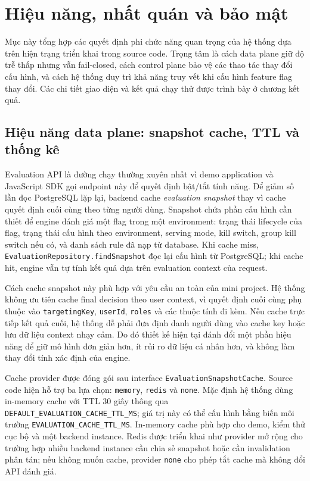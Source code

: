 \section{Hiệu năng, nhất quán và bảo mật}

Mục này tổng hợp các quyết định phi chức năng quan trọng của hệ thống dựa trên hiện trạng triển khai trong source code. Trọng tâm là cách data plane giữ độ trễ thấp nhưng vẫn fail-closed, cách control plane bảo vệ các thao tác thay đổi cấu hình, và cách hệ thống duy trì khả năng truy vết khi cấu hình feature flag thay đổi. Các chi tiết giao diện và kết quả chạy thử được trình bày ở chương kết quả.

\subsection{Hiệu năng data plane: snapshot cache, TTL và thống kê}

Evaluation API là đường chạy thường xuyên nhất vì demo application và JavaScript SDK gọi endpoint này để quyết định bật/tắt tính năng. Để giảm số lần đọc PostgreSQL lặp lại, backend cache \textit{evaluation snapshot} thay vì cache quyết định cuối cùng theo từng người dùng. Snapshot chứa phần cấu hình cần thiết để engine đánh giá một flag trong một environment: trạng thái lifecycle của flag, trạng thái cấu hình theo environment, serving mode, kill switch, group kill switch nếu có, và danh sách rule đã nạp từ database. Khi cache miss, \texttt{EvaluationRepository.findSnapshot} đọc lại cấu hình từ PostgreSQL; khi cache hit, engine vẫn tự tính kết quả dựa trên evaluation context của request.

Cách cache snapshot này phù hợp với yêu cầu an toàn của mini project. Hệ thống không ưu tiên cache final decision theo user context, vì quyết định cuối cùng phụ thuộc vào \texttt{targetingKey}, \texttt{userId}, \texttt{roles} và các thuộc tính đi kèm. Nếu cache trực tiếp kết quả cuối, hệ thống dễ phải đưa định danh người dùng vào cache key hoặc lưu dữ liệu context nhạy cảm. Do đó thiết kế hiện tại đánh đổi một phần hiệu năng để giữ mô hình đơn giản hơn, ít rủi ro dữ liệu cá nhân hơn, và không làm thay đổi tính xác định của engine.

Cache provider được đóng gói sau interface \texttt{EvaluationSnapshotCache}. Source code hiện hỗ trợ ba lựa chọn: \texttt{memory}, \texttt{redis} và \texttt{none}. Mặc định hệ thống dùng in-memory cache với TTL 30 giây thông qua \texttt{DEFAULT\_EVALUATION\_CACHE\_TTL\_MS}; giá trị này có thể cấu hình bằng biến môi trường \texttt{EVALUATION\_CACHE\_TTL\_MS}. In-memory cache phù hợp cho demo, kiểm thử cục bộ và một backend instance. Redis được triển khai như provider mở rộng cho trường hợp nhiều backend instance cần chia sẻ snapshot hoặc cần invalidation phân tán; nếu không muốn cache, provider \texttt{none} cho phép tắt cache mà không đổi API đánh giá.

